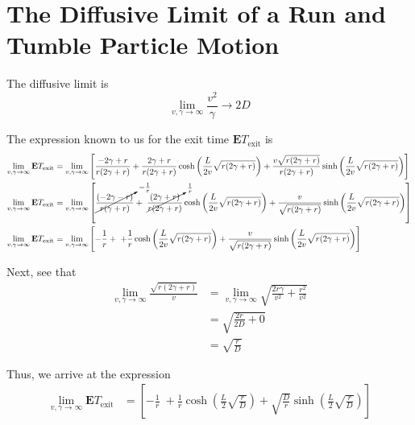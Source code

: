 \documentclass[11pt, letterpaper]{scrartcl}
\newcommand{\E}{\mathbf{E}}
\begin{document}
\section{The Diffusive Limit of a Run and Tumble Particle Motion}

\newcommand{\difflim}{\lim_{v,\gamma \to \infty}}
The diffusive limit is 
\begin{equation}
    \lim_{v,\gamma \to \infty} \frac{v^{2}}{\gamma} \to 2D  
\end{equation}

The expression known to us for the exit time $\E T_{\text{exit}}$ is 
\begin{align}
    \difflim \E T_{\text{exit}} &= \difflim 
    \left[
        \frac{-2\gamma+r}{r(2\gamma+r)} + 
        \frac{2\gamma+r}{r(2\gamma+r)} \cosh \left( \frac{L}{2v} \sqrt{r(2\gamma+r)} \right) +
        \frac{v \sqrt{r(2\gamma+r)}}{r(2\gamma+r)} \sinh\left( \frac{L}{2v} \sqrt{r(2\gamma+r)} \right) 
    \right] \\
    \difflim \E T_{\text{exit}} &= \difflim 
    \left[
        \cancelto{-\frac{1}{r}}{\frac{(-2\gamma-r)}{r(\gamma+r)}} + \;
        \cancelto{\frac{1}{r}}{\frac{(2\gamma+r)}{r(2\gamma+r)}} \cosh \left( \frac{L}{2v} \sqrt{r(2\gamma+r)} \right) +
        \frac{v}{\sqrt{r(2\gamma+r)}} \sinh\left( \frac{L}{2v} \sqrt{r(2\gamma+r)} \right) 
    \right] \\
    \difflim \E T_{\text{exit}} &= \difflim 
    \left[
        -\frac{1}{r} + \;
        +\frac{1}{r} \cosh \left( \frac{L}{2v} \sqrt{r(2\gamma+r)} \right) +
        \frac{v}{\sqrt{r(2\gamma+r)}} \sinh\left( \frac{L}{2v} \sqrt{r(2\gamma+r)} \right) 
    \right] 
\end{align}

Next, see that
\begin{align}
    \difflim \frac{\sqrt{r(2\gamma+r)}}{v} 
    &= \difflim \sqrt{\frac{2r \gamma}{v^{2}} + \frac{r^{2}}{v^{2}}} \\
    &= \sqrt{\frac{2r}{2D} + 0} \\
    &= \sqrt{\frac{r}{D}}
\end{align} 

Thus, we arrive at the expression
\begin{align}
     \difflim \E T_{\text{exit}} &= 
    \left[
        -\frac{1}{r} \;
        +\frac{1}{r} \cosh \left( \frac{L}{2} \sqrt{\frac{r}{D}} \right) +
        \sqrt{\frac{D}{r}} \sinh\left( \frac{L}{2} \sqrt{\frac{r}{D}} \right) 
    \right] 
\end{align}
\end{document}
